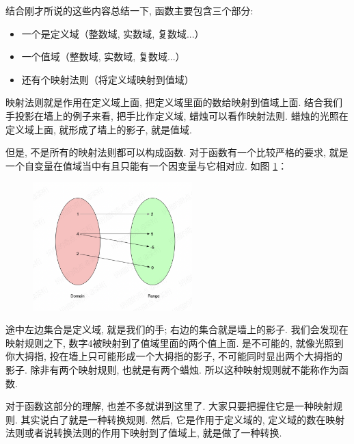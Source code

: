 结合刚才所说的这些内容总结一下, 函数主要包含三个部分:

\begin{itemize}
  \item 一个是定义域（整数域, 实数域, 复数域...）
  \item 一个值域（整数域, 实数域, 复数域...）
  \item 还有个映射法则（将定义域映射到值域）
\end{itemize}

映射法则就是作用在定义域上面, 把定义域里面的数给映射到值域上面. 结合我们手投影在墙上的例子来看, 把手比作定义域, 蜡烛可以看作映射法则. 蜡烛的光照在定义域上面, 就形成了墙上的影子, 就是值域. 

但是, 不是所有的映射法则都可以构成函数. 对于函数有一个比较严格的要求, 就是一个自变量在值域当中有且只能有一个因变量与它相对应. 如图 \ref{fig:img7_3}：

\begin{figure}[ht]
  \centering
  \includegraphics[width=0.55\textwidth]{asset/78b109d0-c39f-446b-ba0a-2b983138d76f.png}
  \caption{}
  \label{fig:img7_3}
\end{figure}

途中左边集合是定义域, 就是我们的手; 右边的集合就是墙上的影子. 我们会发现在映射规则之下, 数字4被映射到了值域里面的两个值上面. 是不可能的, 就像光照到你大拇指, 投在墙上只可能形成一个大拇指的影子, 不可能同时显出两个大拇指的影子. 除非有两个映射规则, 也就是有两个蜡烛. 所以这种映射规则就不能称作为函数. 

对于函数这部分的理解, 也差不多就讲到这里了. 大家只要把握住它是一种映射规则. 其实说白了就是一种转换规则. 然后, 它是作用于定义域的, 定义域的数在映射法则或者说转换法则的作用下映射到了值域上, 就是做了一种转换. 